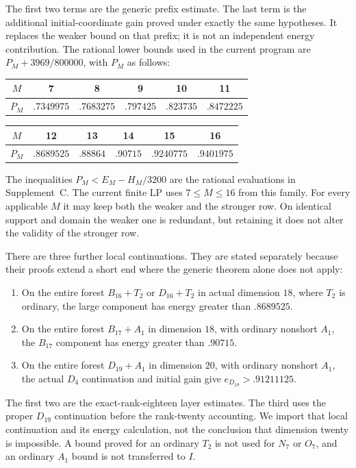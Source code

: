 The first two terms are the generic prefix estimate. The last term is
the additional initial-coordinate gain proved under exactly the same
hypotheses. It replaces the weaker bound on that prefix; it is not an
independent energy contribution. The rational lower bounds used in the
current program are $P_M+3969/800000$, with $P_M$ as follows:
\begin{center}
\begin{tabular}{c|ccccc}
$M$&7&8&9&10&11\\\hline
$P_M$&$.7349975$&$.7683275$&$.797425$&$.823735$&$.8472225$\\[2pt]
\end{tabular}
\par\smallskip
\begin{tabular}{c|ccccc}
$M$&12&13&14&15&16\\\hline
$P_M$&$.8689525$&$.88864$&$.90715$&$.9240775$&$.9401975$
\end{tabular}
\end{center}
The inequalities $P_M<E_M-H_M/3200$ are the rational evaluations in
Supplement~C. The current finite LP uses $7\le M\le16$ from this family.
For every applicable $M$ it may keep both the weaker and the stronger
row. On identical support and domain the weaker one is redundant, but
retaining it does not alter the validity of the stronger row.

There are three further local continuations. They are stated separately
because their proofs extend a short end where the generic theorem alone
does not apply:
\begin{enumerate}[label=\textup{(\roman*)}]
\item On the entire forest $B_{16}+T_2$ or $D_{16}+T_2$ in actual
 dimension $18$, where $T_2$ is ordinary, the large component has energy
 greater than $.8689525$.
\item On the entire forest $B_{17}+A_1$ in dimension $18$, with ordinary
 nonshort $A_1$, the $B_{17}$ component has energy greater than $.90715$.
\item On the entire forest $D_{19}+A_1$ in dimension $20$, with ordinary
 nonshort $A_1$, the actual $D_4$ continuation and initial gain give
 $e_{D_{19}}>.91211125$.
\end{enumerate}
The first two are the exact-rank-eighteen layer estimates. The third
uses the proper $D_{19}$ continuation before the rank-twenty accounting.
We import that local continuation and its energy calculation, not the
conclusion that dimension twenty is impossible. A bound proved for an
ordinary $T_2$ is not used for $N_7$ or $O_7$, and an ordinary $A_1$
bound is not transferred to $I$.

